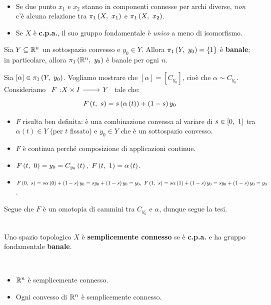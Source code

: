\begin{observes}~{}
	\begin{itemize}
		\item Se due punto $x_1$ e $x_2$ stanno in componenti connesse per archi diverse, \textit{non} c'è alcuna relazione tra $\gruf{X}{x_1}$ e $\gruf{X}{x_2}$.
		\item Se $X$ è \textbf{c.p.a.}, il suo gruppo fondamentale è \textit{unico} a meno di isomorfismo.
	\end{itemize}
\vspace{-3mm}
\end{observes}
\begin{example}
	Sia $Y\subseteq \mathbb{R}^n$ un sottospazio convesso e $y_0\in Y$.
	Allora $\gruf{Y}{y_0}=\left\{1\right\}$ è \textbf{banale}; in particolare, allora $\gruf{\realset^n}{y_0}$ è banale per ogni $n$.
\end{example}
\begin{demonstration}
	Sia $\left[\alpha\right]\in\gruf{Y}{y_0}$. Vogliamo mostrare che $\left[\alpha\right]=\left[C_{y_0}\right]$, cioè che $\alpha\sim C_{y_0}$.\\
	Consideriamo $\funz{F}{X\times I}{Y}$ tale che:
	\begin{equation*}
		F\left(t,\ s\right)=s\left(\alpha\left(t\right)\right)+\left(1-s\right)y_0
	\end{equation*}
\begin{itemize}
	\item $F$ risulta ben definita: è una combinazione convessa al variare di $s\in\left[0,\ 1\right]$ tra $\alpha\left(t\right)\in Y$ (per $t$ fissato) e $y_0\in Y$ che è un sottospazio convesso.
	\item $F$ è continua perché composizione di applicazioni continue.
	\item $\mvf{F}{t}{0}=y_0=C_{y_0}\left(t\right),\ \mvf{F}{t}{1}=\alpha\left(t\right)$.
	\item $\mvf{F}{0}{s}=s\alpha\left(0\right)+\left(1-s\right)y_0=sy_0+\left(1-s\right)y_0=y_0,\ \mvf{F}{1}{s}=s\alpha\left(1\right)+\left(1-s\right)y_0=sy_0+\left(1-s\right)y_0=y_0$.
\end{itemize}
Segue che $F$ è un omotopia di cammini tra $C_{y_0}$ e $\alpha$, dunque segue la tesi.
\end{demonstration}
\begin{define}~{}\\
	Uno spazio topologico $X$ è \textbf{semplicemente connesso} se è \textbf{c.p.a.} e ha gruppo fondamentale \textbf{banale}.
\end{define}
\begin{examples}~{}
	\begin{itemize}
		\item $\mathbb{R}^n$ è semplicemente connesso.
		\item Ogni convesso di $\mathbb{R}^n$ è semplicemente connesso.
	\end{itemize}
\vspace{-3mm}
\end{examples}
